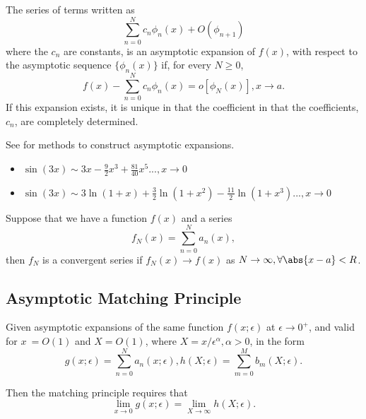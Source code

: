 \begin{refsection}
\begin{definition}\cite[14]{johnson2006singular}\cite[10]{holmes2012introduction}
	The series of terms written as
	$$\sum_{n=0}^N c_n\phi_n(x) + O(\phi_{n+1})$$
	where the $c_n$ are constants, is an asymptotic expansion of $f(x)$, with respect to the asymptotic sequence $\{\phi_n(x)\}$ if, for every $N \geq 0$,
	$$f(x) - \sum_{n=0}^N c_n\phi_n(x) = o[\phi_N(x)],x\to a.$$
	If this expansion exists, it is unique in that the coefficient in that the coefficients, $c_n$, are completely determined.
\end{definition}

\begin{remark}
See \cite[12]{holmes2012introduction} for methods to construct asymptotic expansions.  	
\end{remark}

\begin{example}\hfill
	\begin{itemize}
		\item $\sin(3x) \sim 3x - \frac{9}{2}x^3 + \frac{81}{40}x^5 ..., x\to 0$
		\item $\sin(3x) \sim 3\ln(1+x) + \frac{3}{2}\ln(1+x^2) - \frac{11}{2}\ln(1+x^3) ..., x\to 0$
	\end{itemize}
\end{example}


\begin{remark}
	Suppose that we have a function $f(x)$ and a series
	$$f_N(x) = \sum_{n=0}^{N} a_n(x),$$
	then $f_N$ is a convergent series if $f_N(x)\to f(x)$ as $N\to \infty, \forall \abs{x - a} < R$.
\end{remark}

\subsection{Asymptotic Matching Principle}
\begin{definition}\cite[30]{johnson2006singular}\cite[60]{holmes2012introduction}\label{ch:multiscale-modeling:def:asymptoticmatchingprinciple}
Given asymptotic expansions of the same function $f(x;\epsilon)$ at $\epsilon \to 0^+$, and valid for $x\ = O(1)$ and $X=O(1)$, where $X = x/\epsilon^\alpha, \alpha > 0$, in the form
$$g(x;\epsilon) = \sum_{n=0}^N a_n(x;\epsilon),h(X;\epsilon) = \sum_{m=0}^M b_m(X;\epsilon).$$

Then the matching principle requires that 
$$\lim_{x\to 0} g(x;\epsilon) = \lim_{X\to \infty} h(X;\epsilon).$$


\end{definition}
\end{refsection}
